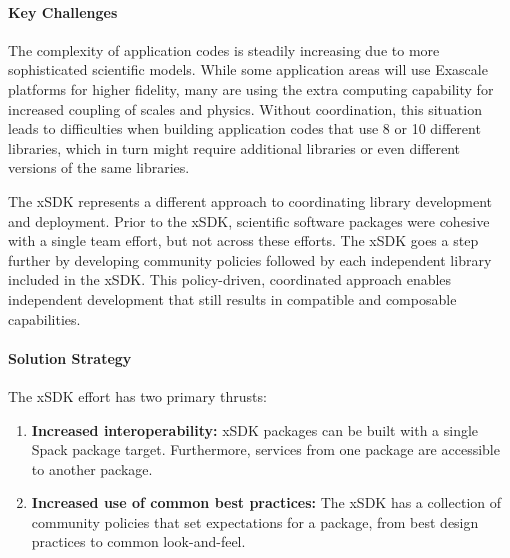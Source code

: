 \paragraph{Key Challenges}
The complexity of application codes is steadily increasing due to more sophisticated scientific models.  While some application areas will use Exascale platforms for higher fidelity, many are using the extra computing capability for increased coupling of scales and physics.  Without coordination, this situation  leads to difficulties when building application codes that use 8 or 10 different libraries, which in turn might require additional libraries or even different versions of the same libraries.

The xSDK represents a different approach to coordinating library development and deployment.  Prior to the xSDK, scientific software packages were cohesive with a single team effort, but not across these efforts. The xSDK goes a step further by developing community policies followed by each independent library included in the xSDK.  This policy-driven, coordinated approach enables independent development that still results in compatible and composable capabilities.

\paragraph{Solution Strategy}

The xSDK effort has two primary thrusts:
\begin{enumerate}
	\item \textbf{Increased interoperability:} xSDK packages can be built with a single Spack package target.  Furthermore, services from one package are accessible to another package.
	\item \textbf{Increased use of common best practices:}  The xSDK has a collection of community policies that set expectations for a package, from best design practices to common look-and-feel.
\end{enumerate}

